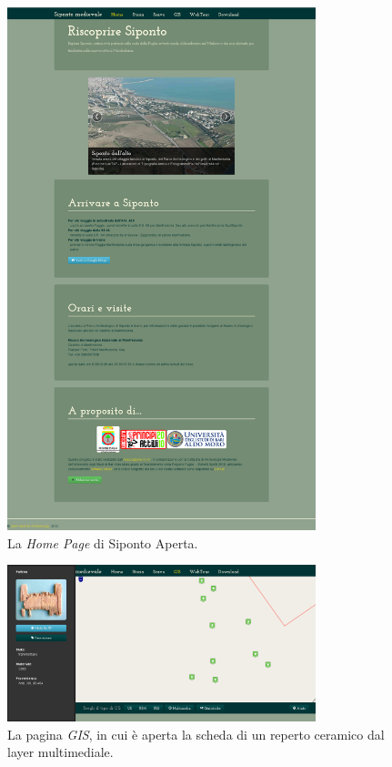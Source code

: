 \documentclass{paper}
\begin{document}
\begin{figure}
    \centering
    \includegraphics[width=0.8\textwidth]{img/home}
    \caption[\textit{Home page} di Siponto Aperta]{La \textit{Home Page} di Siponto Aperta.}
    \label{fig:home}
\end{figure}

\begin{figure}
    \centering
    \includegraphics[width=0.8\textwidth]{img/gis}
    \caption[La pagina \emph{GIS}]{La pagina \emph{GIS}, in cui è aperta la scheda di un reperto ceramico dal layer multimediale.}
    \label{fig:gis}
\end{figure}
\end{document}
